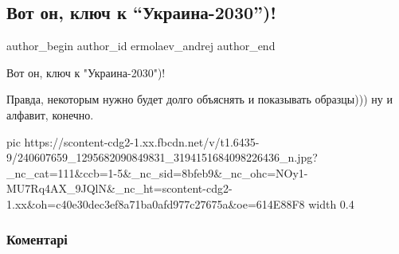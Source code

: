  
 
 
 
 
 
\subsection{Вот он, ключ к \enquote{Украина-2030})!}
\label{sec:25_08_2021.fb.ermolaev_andrej.1.kluch_ukraina_2030_kniga}
 
\ifcmt
 author_begin
   author_id ermolaev_andrej
 author_end
\fi

Вот он, ключ к "Украина-2030")!

Правда, некоторым нужно будет долго объяснять и показывать образцы))) ну и
алфавит, конечно.

\ifcmt
  pic https://scontent-cdg2-1.xx.fbcdn.net/v/t1.6435-9/240607659_1295682090849831_3194151684098226436_n.jpg?_nc_cat=111&ccb=1-5&_nc_sid=8bfeb9&_nc_ohc=NOy1-MU7Rq4AX_9JQlN&_nc_ht=scontent-cdg2-1.xx&oh=c40e30dec3ef8a71ba0afd977c27675a&oe=614E88F8
  width 0.4
\fi

\subsubsection{Коментарі}

